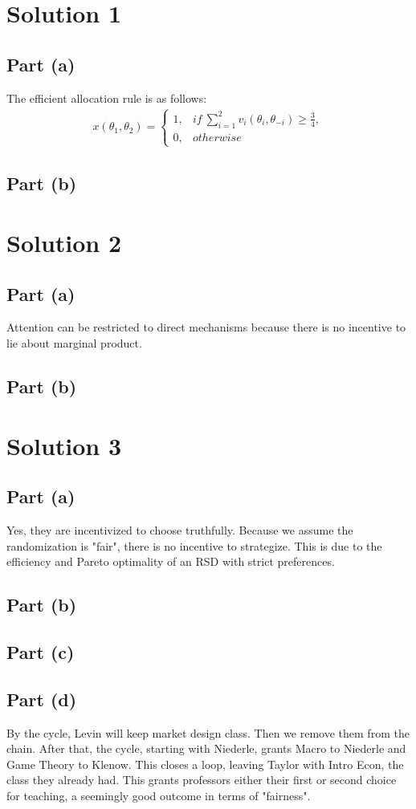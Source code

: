 \documentclass[10pt,a4paper]{article}
\begin{document}
\section*{Solution 1}
  \subsection*{Part (a)}
    The efficient allocation rule is as follows:
    \begin{gather*}
      x(\theta_1,\theta_2) = \begin{cases}
        1, & if \ \sum\limits_{i=1}^2v_i(\theta_i,\theta_{-i})\geq\frac{3}{4}, \\
        0, & otherwise
      \end{cases}
    \end{gather*}
  \subsection*{Part (b)}
\section*{Solution 2}
  \subsection*{Part (a)}
    Attention can be restricted to direct mechanisms because there is no incentive to lie about marginal product. 

  \subsection*{Part (b)}
    
\section*{Solution 3}
  \subsection*{Part (a)}
    Yes, they are incentivized to choose truthfully. Because we assume the randomization is "fair", there is no incentive to strategize. This is due to the efficiency and Pareto optimality of an RSD with strict preferences.
  \subsection*{Part (b)}

  \subsection*{Part (c)}
    
  \subsection*{Part (d)}
    By the cycle, Levin will keep market design class. Then we remove them from the chain. After that, the cycle, starting with Niederle, grants Macro to Niederle and Game Theory to Klenow. This closes a loop, leaving Taylor with Intro Econ, the class they already had. This grants professors either their first or second choice for teaching, a seemingly good outcome in terms of "fairness".
\end{document}
